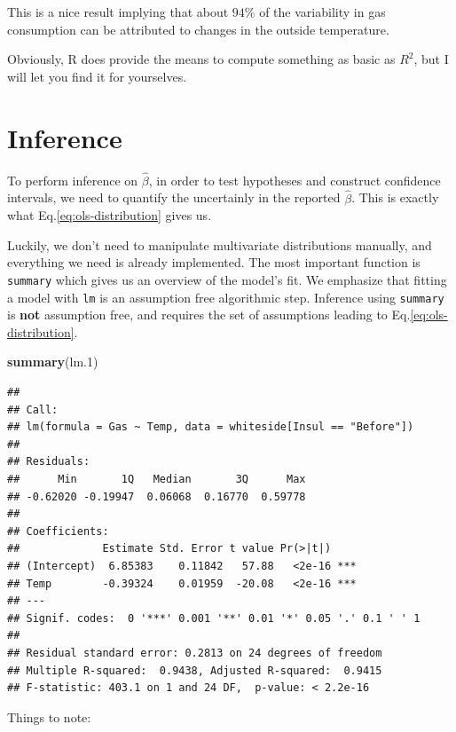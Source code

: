 \documentclass[]{book}
\newenvironment{Shaded}{\begin{snugshade}}{\end{snugshade}}
\newcommand{\FloatTok}[1]{\textcolor[rgb]{0.00,0.00,0.81}{#1}}
\newcommand{\KeywordTok}[1]{\textcolor[rgb]{0.13,0.29,0.53}{\textbf{#1}}}
\newcommand{\NormalTok}[1]{#1}
\theoremstyle{definition}
\theoremstyle{definition}
\theoremstyle{definition}
\theoremstyle{remark}
\begin{document}
This is a nice result implying that about \(94\%\) of the variability in gas consumption can be attributed to changes in the outside temperature.

Obviously, R does provide the means to compute something as basic as \(R^2\), but I will let you find it for yourselves.

\hypertarget{inference}{%
\section{Inference}\label{inference}}

To perform inference on \(\hat \beta\), in order to test hypotheses and construct confidence intervals, we need to quantify the uncertainly in the reported \(\hat \beta\).
This is exactly what Eq.\eqref{eq:ols-distribution} gives us.

Luckily, we don't need to manipulate multivariate distributions manually, and everything we need is already implemented.
The most important function is \texttt{summary} which gives us an overview of the model's fit.
We emphasize that fitting a model with \texttt{lm} is an assumption free algorithmic step.
Inference using \texttt{summary} is \textbf{not} assumption free, and requires the set of assumptions leading to Eq.\eqref{eq:ols-distribution}.

\begin{Shaded}
\begin{Highlighting}[]
\KeywordTok{summary}\NormalTok{(lm}\FloatTok{.1}\NormalTok{)}
\end{Highlighting}
\end{Shaded}

\begin{verbatim}
## 
## Call:
## lm(formula = Gas ~ Temp, data = whiteside[Insul == "Before"])
## 
## Residuals:
##      Min       1Q   Median       3Q      Max 
## -0.62020 -0.19947  0.06068  0.16770  0.59778 
## 
## Coefficients:
##             Estimate Std. Error t value Pr(>|t|)    
## (Intercept)  6.85383    0.11842   57.88   <2e-16 ***
## Temp        -0.39324    0.01959  -20.08   <2e-16 ***
## ---
## Signif. codes:  0 '***' 0.001 '**' 0.01 '*' 0.05 '.' 0.1 ' ' 1
## 
## Residual standard error: 0.2813 on 24 degrees of freedom
## Multiple R-squared:  0.9438, Adjusted R-squared:  0.9415 
## F-statistic: 403.1 on 1 and 24 DF,  p-value: < 2.2e-16
\end{verbatim}

Things to note:
\end{document}
